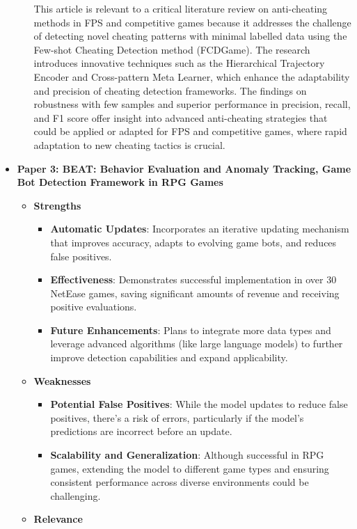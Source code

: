 \documentclass[a4paper, 12pt]{article}
\begin{document}
\begin{itemize}
\begin{itemize}
        This article is relevant to a critical literature review on anti-cheating methods in FPS and competitive games because it addresses the challenge of detecting novel cheating patterns with minimal labelled data using the Few-shot Cheating Detection method (FCDGame). The research introduces innovative techniques such as the Hierarchical Trajectory Encoder and Cross-pattern Meta Learner, which enhance the adaptability and precision of cheating detection frameworks. The findings on robustness with few samples and superior performance in precision, recall, and F1 score offer insight into advanced anti-cheating strategies that could be applied or adapted for FPS and competitive games, where rapid adaptation to new cheating tactics is crucial.
    \end{itemize}
    \item \textbf{Paper 3: BEAT: Behavior Evaluation and Anomaly Tracking, Game Bot Detection Framework in RPG Games} 
    \begin{itemize}
        \item \textbf{Strengths}
        \begin{itemize}
            \item \textbf{Automatic Updates}: Incorporates an iterative updating mechanism that improves accuracy, adapts to evolving game bots, and reduces false positives.
            \item \textbf{Effectiveness}: Demonstrates successful implementation in over 30 NetEase games, saving significant amounts of revenue and receiving positive evaluations.
            \item \textbf{Future Enhancements}: Plans to integrate more data types and leverage advanced algorithms (like large language models) to further improve detection capabilities and expand applicability.
        \end{itemize}
        \item \textbf{Weaknesses}
        \begin{itemize}
            \item \textbf{Potential False Positives}: While the model updates to reduce false positives, there’s a risk of errors, particularly if the model's predictions are incorrect before an update.
            \item \textbf{Scalability and Generalization}: Although successful in RPG games, extending the model to different game types and ensuring consistent performance across diverse environments could be challenging.
        \end{itemize}
        \item \textbf{Relevance}


\end{itemize}
\end{itemize}
\end{document}
